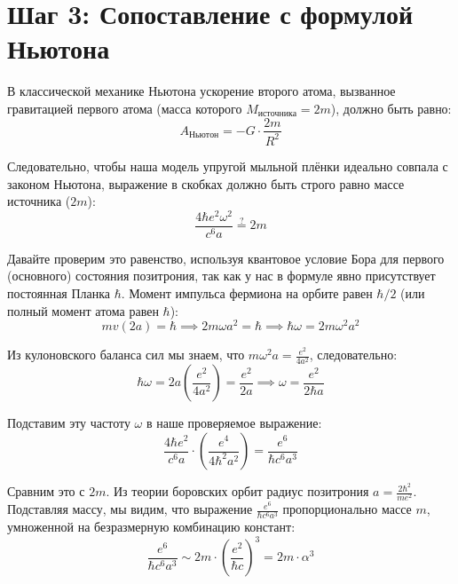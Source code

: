 \documentclass[12pt,a4paper]{article}
\begin{document}
\section*{Шаг 3: Сопоставление с формулой Ньютона}

В классической механике Ньютона ускорение второго атома, вызванное гравитацией первого атома (масса которого $M_{источника} = 2m$), должно быть равно:
\begin{equation}
A_{Ньютон} = - G \cdot \frac{2m}{R^2}
\end{equation}

Следовательно, чтобы наша модель упругой мыльной плёнки идеально совпала с законом Ньютона, выражение в скобках должно быть строго равно массе источника ($2m$):
\begin{equation}
\frac{4 \hbar e^2 \omega^2}{c^6 a} \stackrel{?}{=} 2m
\end{equation}

Давайте проверим это равенство, используя квантовое условие Бора для первого (основного) состояния позитрония, так как у нас в формуле явно присутствует постоянная Планка $\hbar$. Момент импульса фермиона на орбите равен $\hbar/2$ (или полный момент атома равен $\hbar$):
\begin{equation}
m v (2a) = \hbar \implies 2 m \omega a^2 = \hbar \implies \hbar \omega = 2 m \omega^2 a^2
\end{equation}

Из кулоновского баланса сил мы знаем, что $m \omega^2 a = \frac{e^2}{4a^2}$, следовательно:
\begin{equation}
\hbar \omega = 2 a \left( \frac{e^2}{4a^2} \right) = \frac{e^2}{2a} \implies \omega = \frac{e^2}{2 \hbar a}
\end{equation}

Подставим эту частоту $\omega$ в наше проверяемое выражение:
\begin{equation}
\frac{4 \hbar e^2}{c^6 a} \cdot \left( \frac{e^4}{4 \hbar^2 a^2} \right) = \frac{e^6}{\hbar c^6 a^3}
\end{equation}

Сравним это с $2m$. Из теории боровских орбит радиус позитрония $a = \frac{2 \hbar^2}{m e^2}$. Подставляя массу, мы видим, что выражение $\frac{e^6}{\hbar c^6 a^3}$ пропорционально массе $m$, умноженной на безразмерную комбинацию констант:
\begin{equation}
\frac{e^6}{\hbar c^6 a^3} \sim 2m \cdot \left( \frac{e^2}{\hbar c} \right)^3 = 2m \cdot \alpha^3
\end{equation}
\end{document}
